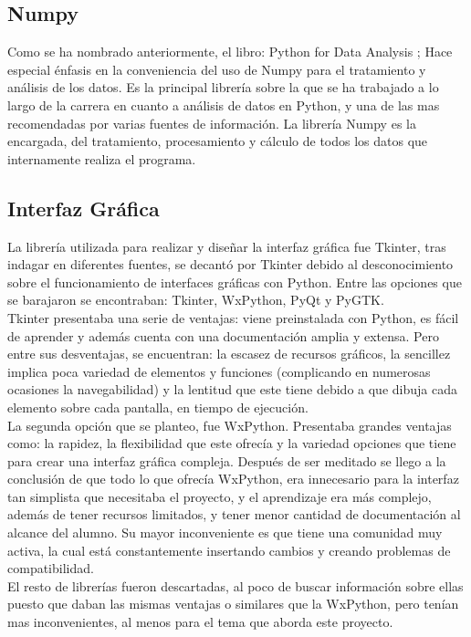 \subsection{Numpy}
Como se ha nombrado anteriormente, el libro: Python for Data Analysis \cite{analisis}; Hace especial énfasis en la conveniencia del uso de Numpy para el tratamiento y análisis de los datos. Es la principal librería sobre la que se ha  trabajado a lo largo de la carrera en cuanto a análisis de datos en Python, y una de las mas recomendadas por varias fuentes de información. La librería Numpy es la encargada, del tratamiento, procesamiento y cálculo de todos los datos que internamente realiza el programa.
\subsection{Interfaz Gráfica}
La librería utilizada para realizar y diseñar la interfaz gráfica fue Tkinter, tras indagar en diferentes fuentes, se decantó por Tkinter debido al desconocimiento sobre el funcionamiento de interfaces gráficas con Python. Entre las opciones que se barajaron se encontraban: Tkinter, WxPython, PyQt y PyGTK.\\

Tkinter presentaba una serie de ventajas: viene preinstalada con Python, es fácil de aprender y además cuenta con una documentación amplia y extensa. Pero entre sus desventajas, se encuentran: la escasez de recursos gráficos, la sencillez implica poca variedad de elementos y funciones (complicando en numerosas ocasiones la navegabilidad) y la lentitud que este tiene debido a que dibuja cada elemento sobre cada pantalla, en tiempo de ejecución.\\

La segunda opción que se planteo, fue WxPython. Presentaba  grandes ventajas como: la rapidez,  la flexibilidad que este ofrecía y la variedad opciones que tiene para crear una interfaz gráfica compleja. Después de ser meditado se llego a la conclusión de que todo lo que  ofrecía WxPython, era innecesario para la interfaz tan simplista que necesitaba el proyecto, y el aprendizaje era más complejo, además de tener recursos limitados, y tener menor cantidad de documentación al alcance del alumno. Su mayor inconveniente es que tiene una comunidad muy activa, la cual está constantemente insertando cambios y creando problemas de compatibilidad.\\

El resto de librerías fueron descartadas, al poco de buscar información sobre ellas puesto que daban las mismas ventajas o similares que la WxPython, pero tenían mas inconvenientes, al menos para el tema que aborda este proyecto.
